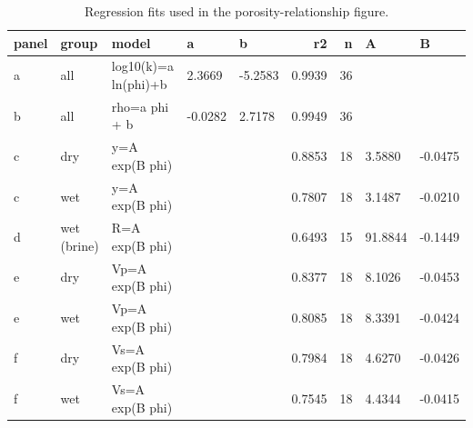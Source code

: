 \begin{table}[ht!]
\centering
\caption{Regression fits used in the porosity-relationship figure.}
\label{tab:porosity\_relationships\_fits}
\begin{tabular}{lllllrrll}
\toprule
\textbf{panel} & \textbf{group} & \textbf{model} & \textbf{a} & \textbf{b} & \textbf{r2} & \textbf{n} & \textbf{A} & \textbf{B} \\
\midrule
a & all & log10(k)=a ln(phi)+b & 2.3669 & -5.2583 & 0.9939 & 36 &  &  \\
b & all & rho=a phi + b & -0.0282 & 2.7178 & 0.9949 & 36 &  &  \\
c & dry & y=A exp(B phi) &  &  & 0.8853 & 18 & 3.5880 & -0.0475 \\
c & wet & y=A exp(B phi) &  &  & 0.7807 & 18 & 3.1487 & -0.0210 \\
d & wet (brine) & R=A exp(B phi) &  &  & 0.6493 & 15 & 91.8844 & -0.1449 \\
e & dry & Vp=A exp(B phi) &  &  & 0.8377 & 18 & 8.1026 & -0.0453 \\
e & wet & Vp=A exp(B phi) &  &  & 0.8085 & 18 & 8.3391 & -0.0424 \\
f & dry & Vs=A exp(B phi) &  &  & 0.7984 & 18 & 4.6270 & -0.0426 \\
f & wet & Vs=A exp(B phi) &  &  & 0.7545 & 18 & 4.4344 & -0.0415 \\
\bottomrule
\end{tabular}
\end{table}
